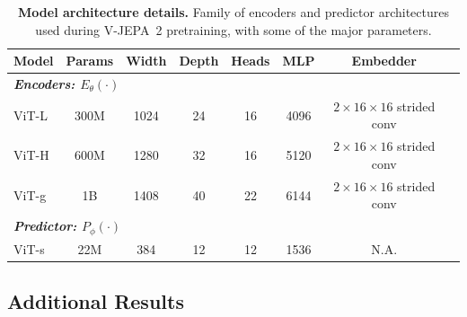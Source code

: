 \documentclass[]{fairmeta}
\newcommand{\model}{V-JEPA~2\xspace}
\begin{document}
\begin{table}[h]
    \centering
    \small
    \caption{
    \textbf{Model architecture details.}  Family of encoders and predictor architectures used during \model pretraining, with some of the major parameters.}
    \begin{tabular}{lccccccc}
    \toprule
    Model & Params & Width & Depth & Heads & MLP & Embedder\\
    \midrule
    \multicolumn{7}{l}{\bf\it Encoders: $E_\theta(\cdot)$}\\[1ex]
    ViT-L & 300M &  1024 & 24 & 16  & 4096  & $2\times16\times16$ strided conv\\
    ViT-H & 600M &  1280 & 32 & 16 &  5120 &  $2\times16\times16$ strided conv\\
    ViT-g & 1B &  1408 &  40 & 22 & 6144 &  $2\times16\times16$ strided conv\\
    \midrule
    \multicolumn{7}{l}{\bf\it Predictor: $P_\phi(\cdot)$}\\[1ex]
    ViT-s & 22M &  384  & 12  & 12 & 1536 & N.A.\\
    \bottomrule
    \end{tabular}
    \label{table:vit_architecture}
\end{table}



\subsection{Additional Results}
\end{document}

